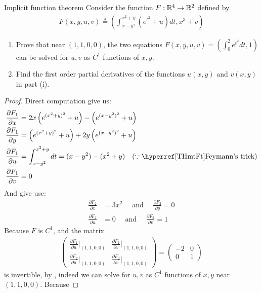 \documentclass{report}
\begin{document}
\begin{question}{Implicit function theorem}{}
Consider the function $F:\mathbb{R}^4\rightarrow \mathbb{R}^2$ defined by 
\begin{align*}
F(x,y,u,v)\triangleq \left(\int_{x-y^2}^{x^2+y}(e^{t^2}+u)dt,x^3+v \right)
\end{align*}
\begin{enumerate}[label=(\roman*)]
  \item Prove that near $(1,1,0,0)$, the two equations $F(x,y,u,v)=(\int_0^2 e^{t^2}dt,1)$ can be solved for $u,v$ as  $C^1$ functions of  $x,y$.  
  \item Find the first order partial derivatives of the functions $u(x,y)$ and $v(x,y)$ in part (i). 
\end{enumerate}
\end{question}
\begin{proof}
Direct computation give us: 
\begin{align*}
\frac{\partial F_1}{\partial x}&= 2x\left(e^{(x^2+y)^2} +u \right) - \left(e^{(x-y^2)^2} +u \right) \\
\frac{\partial F_1}{\partial y}&= \left(e^{(x^2+y)^2} +u \right) + 2y \left(e^{(x-y^2)^2}+ u \right) \\
\frac{\partial F_1}{\partial u}&=  \int_{x-y^2}^{x^2+y} dt= (x-y^2)-(x^2+y) \quad (\because \text{\customref{THmtFt}{Feymann's trick}})\\
\frac{\partial F_1}{\partial v}&=0 
\end{align*}
And give use:
\begin{align*}
\frac{\partial F_2}{\partial x}&= 3x^2 \quad \text{ and }\quad \frac{\partial F_2}{\partial y}=0 \\
\frac{\partial F_2}{\partial u}&= 0 \quad \text{ and }\quad \frac{\partial F_2}{\partial v}= 1
\end{align*}
Because $F$ is  $C^1$, and the matrix 
\begin{align*}
\begin{pmatrix} 
  \frac{\partial F_1}{\partial u} \big|_{(1,1,0,0)} & \frac{\partial F_1}{\partial v} \big|_{(1,1,0,0)}  \\
  \frac{\partial F_2}{\partial u} \big|_{(1,1,0,0)} & \frac{\partial F_2}{\partial v} \big|_{(1,1,0,0)}  
\end{pmatrix} = \begin{pmatrix} 
  -2 & 0\\
  0 & 1 
\end{pmatrix}
\end{align*}
is invertible, by , indeed we can solve for $u,v$ as $C^1$ functions of  $x,y$ near $(1,1,0,0)$. Because 

\end{proof}
\end{document}

